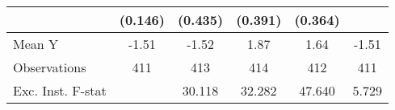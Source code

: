 {\begin{tabular}{l*{5}{c}}
            &     (0.146)         &     (0.435)         &     (0.391)         &     (0.364)         &                     \\
\midrule
Mean Y      &       -1.51         &       -1.52         &        1.87         &        1.64         &       -1.51         \\
Observations&         411         &         413         &         414         &         412         &         411         \\
Exc. Inst. F-stat&                     &      30.118         &      32.282         &      47.640         &       5.729         \\
\bottomrule
\end{tabular}
}
